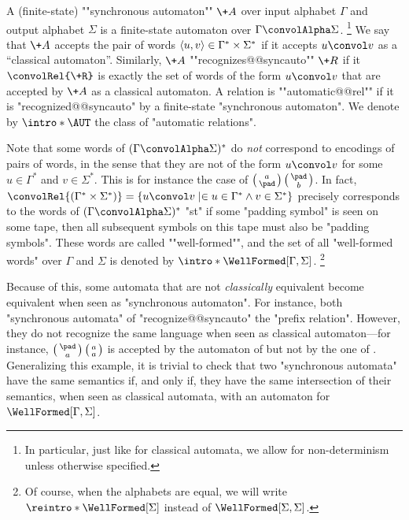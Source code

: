 A (finite-state) \AP""synchronous automaton"" $\+A$ over input alphabet $\Gamma$ and output alphabet $\Sigma$
is a finite-state automaton over $\Gamma\convolAlpha \Sigma$.%
\footnote{In particular, just like for classical automata, we allow for non-determinism
unless otherwise specified.}
We say that $\+A$ accepts the pair of words $\langle u,v\rangle \in \Gamma^* \times \Sigma^*$ if
it accepts $u \convol v$ as a ``classical automaton''. Similarly, $\+A$ \AP""recognizes@@syncauto""
$\+R$ if it $\convolRel{\+R}$ is exactly the set of
words of the form $u \convol v$ that are accepted by $\+A$ as a classical automaton.
A relation is \AP""automatic@@rel"" if it is "recognized@@syncauto" by a finite-state "synchronous automaton".
We denote by \AP$\intro*\AUT$ the class of "automatic relations".

\begin{remark}
	Note that some words of $(\Gamma\convolAlpha \Sigma)^*$ do \emph{not} correspond to
	encodings of pairs of words, in the sense that they are not of the
	form $u \convol v$ for some $u \in \Gamma^*$ and $v\in \Sigma^*$. 
	This is for instance the case of $\pair{a}{\pad}\pair{\pad}{b}$.
	In fact, $\convolRel{(\Gamma^*\times\Sigma^*)} =
	\{u \convol v \mid \in u \in \Gamma^* \land v\in \Sigma^* \}$ precisely corresponds to
	the words of $(\Gamma\convolAlpha \Sigma)^*$ "st" if some "padding symbol" is seen
	on some tape, then all subsequent symbols on this tape must also be "padding symbols".
	These words are called \AP""well-formed"", and the set of all "well-formed words" over
	$\Gamma$ and $\Sigma$ is denoted by \AP$\intro*\WellFormed[\Gamma,\Sigma]$.%
	\footnote{Of course, when the alphabets are equal, we will write
	$\reintro*\WellFormed[\Sigma]$ instead of $\WellFormed[\Sigma,\Sigma]$.}
\end{remark}

Because of this, some automata that are not \emph{classically} equivalent
become equivalent when seen as "synchronous automaton". For instance, 
both "synchronous automata" of
"recognize@@syncauto" the "prefix relation". However, they do not recognize
the same language when seen as classical automaton---for instance, $\pair{\pad}{a}\pair{a}{a}$
is accepted by the automaton of 
but not by the one of .
Generalizing this example, it is trivial to check that two "synchronous automata"
have the same semantics if, and only if, they have the same
intersection of their semantics, when seen as classical automata, with
an automaton for $\WellFormed[\Gamma,\Sigma]$.

